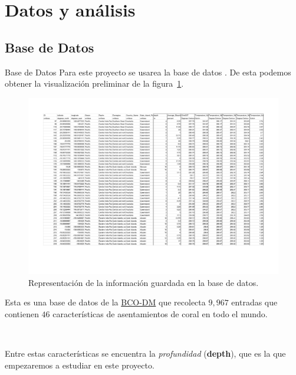 \documentclass[11pt]{beamer}
\begin{document}
\section{Datos y análisis}

	\subsection{Base de Datos}
	\begin{frame}{Base de Datos}
		Para este proyecto se usarea la base de datos \cite{db}. De esta podemos obtener la visualización preliminar de la figura~\ref{fig: tabla}.
	
		\begin{figure}[h]
			\centering
				\includegraphics[height=0.5\textheight]{dataset_coral.png}
			\caption{Representación de la información guardada en la base de datos.}
			\label{fig: tabla}
		\end{figure}
	\end{frame}
	\begin{frame}
		\par Esta es una base de datos de la \href{www.bco-dmo.org}{BCO-DM} que recolecta $9,967$ entradas que contienen $46$ características de asentamientos de coral en todo el mundo.
		\par \
		\par Entre estas características se encuentra la \textit{profundidad} (\textbf{depth}), que es la que empezaremos a estudiar en este proyecto.
	\end{frame}
	
	
\end{document}
